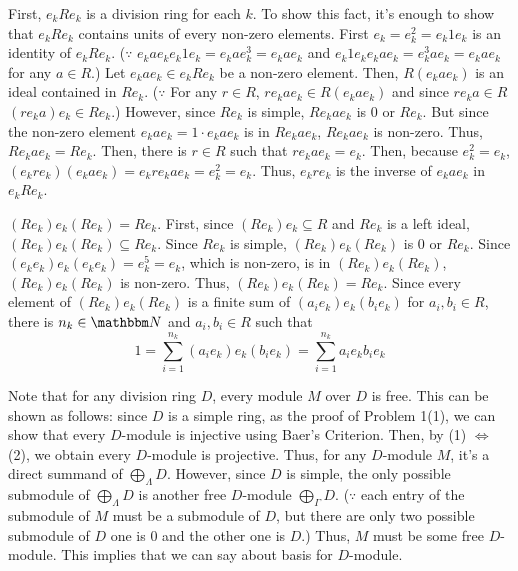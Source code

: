 First, \(e_k R e_k\) is a division ring for each \(k\).
To show this fact, it's enough to show that \(e_k R e_k\) contains units of
every non-zero elements.
First \(e_k = e_k^2 = e_k 1 e_k\) is an identity of \(e_k R e_k\).
(\(\because\)
\(e_k a e_k e_k 1 e_k = e_k a e_k^3 = e_k a e_k\)
and
\(e_k 1 e_k e_k a e_k = e_k^3 a e_k = e_k a e_k\)
for any \(a \in R\).)
Let \(e_k a e_k \in e_k R e_k\) be a non-zero element.
Then, \(R (e_k a e_k)\) is an ideal contained in \(R e_k\).
(\(\because\) For any \(r \in R\),
\(r e_k a e_k \in R (e_k a e_k)\)
and since \(r e_k a \in R\)
\((r e_k a) e_k \in R e_k\).)
However, since \(R e_k\) is simple, \(R e_k a e_k\) is \(0\) or \(R e_k\).
But since the non-zero element \(e_k a e_k = 1 \cdot e_k a e_k\)
is in \(R e_k a e_k\),
\(R e_k a e_k\) is non-zero.
Thus, \(R e_k a e_k = R e_k\).
Then, there is \(r \in R\) such that
\(r e_k a e_k = e_k\).
Then, because \(e_k^2 = e_k\),
\((e_k r e_k) (e_k a e_k) = e_k r e_k a e_k = e_k^2 = e_k\).
Thus, \(e_k r e_k\) is the inverse of \(e_k a e_k\) in \(e_k R e_k\).

\((Re_k)e_k(Re_k) = Re_k\).
First, since \((Re_k)e_k \subseteq R\) and \(Re_k\) is a left ideal,
\((Re_k)e_k(Re_k) \subseteq Re_k\).
Since \(Re_k\) is simple, \((Re_k)e_k(Re_k)\) is \(0\) or \(Re_k\).
Since \((e_k e_k)e_k(e_k e_k) = e_k^5 = e_k\), which is non-zero,
is in \((Re_k)e_k(Re_k)\),
\((Re_k)e_k(Re_k)\) is non-zero.
Thus, \((Re_k)e_k(Re_k) = Re_k\).
Since every element of \((Re_k)e_k(Re_k)\) is a finite sum of
\((a_i e_k) e_k (b_i e_k)\) for \(a_i, b_i \in R\),
there is \(n_k \in \bbN\) and \(a_i, b_i \in R\) such that
\[1 = \sum_{i=1}^{n_k} (a_i e_k) e_k (b_i e_k)
= \sum_{i=1}^{n_k} a_i e_k b_i e_k\]

Note that for any division ring \(D\),
every module \(M\) over \(D\) is free.
This can be shown as follows:
since \(D\) is a simple ring,
as the proof of Problem 1(1),
we can show that every \(D\)-module is injective using Baer's Criterion.
Then, by (1) \(\Leftrightarrow\) (2), we obtain every \(D\)-module is projective.
Thus, for any \(D\)-module \(M\),
it's a direct summand of \(\bigoplus_\Lambda D\).
However, since \(D\) is simple,
the only possible submodule of \(\bigoplus_\Lambda D\)
is another free \(D\)-module \(\bigoplus_\Gamma D\).
(\(\because\) each entry of the submodule of \(M\)
must be a submodule of \(D\), but there are only two possible submodule of \(D\)
one is \(0\) and the other one is \(D\).)
Thus, \(M\) must be some free \(D\)-module.
This implies that we can say about basis for \(D\)-module.

